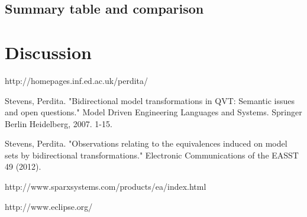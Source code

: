 \documentclass{article}
\begin{document}
\subsection{Summary table and comparison}

\pagebreak
\section{Discussion}

\pagebreak
\begin{thebibliography}{1}

http://homepages.inf.ed.ac.uk/perdita/ 

Stevens, Perdita. "Bidirectional model transformations in QVT: Semantic issues and open questions." Model Driven Engineering Languages and Systems. Springer Berlin Heidelberg, 2007. 1-15.

Stevens, Perdita. "Observations relating to the equivalences induced on model sets by bidirectional transformations." Electronic Communications of the EASST 49 (2012).


http://www.sparxsystems.com/products/ea/index.html

http://www.eclipse.org/


\end{thebibliography}
\end{document}
